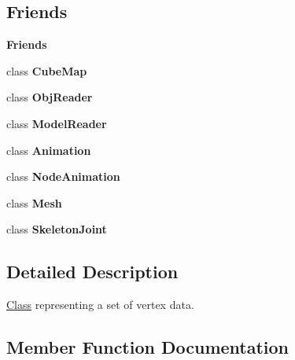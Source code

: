 \subsection*{Friends}
\begin{Indent}\textbf{ Friends}\par
\begin{DoxyCompactItemize}
\item 
\mbox{\label{classrev_1_1_vertex_array_data_a83d06bada150194666fdc02c043d1080}} 
class {\bfseries Cube\+Map}
\item 
\mbox{\label{classrev_1_1_vertex_array_data_aa89c0df06f5945a12b1d029612d199cd}} 
class {\bfseries Obj\+Reader}
\item 
\mbox{\label{classrev_1_1_vertex_array_data_ac3e0a085a76d6fcad904e95ebbe2c6a5}} 
class {\bfseries Model\+Reader}
\item 
\mbox{\label{classrev_1_1_vertex_array_data_af47625f50036c466946f960db7320bcf}} 
class {\bfseries Animation}
\item 
\mbox{\label{classrev_1_1_vertex_array_data_a395c52c1b342efdb79f36b2d4b2f1565}} 
class {\bfseries Node\+Animation}
\item 
\mbox{\label{classrev_1_1_vertex_array_data_aa41a130f156b145bffb3f4b5172c4c93}} 
class {\bfseries Mesh}
\item 
\mbox{\label{classrev_1_1_vertex_array_data_a54a2a68828f99f864406a3713e8ad9a5}} 
class {\bfseries Skeleton\+Joint}
\end{DoxyCompactItemize}
\end{Indent}


\subsection{Detailed Description}
\mbox{\hyperlink{struct_class}{Class}} representing a set of vertex data. 

\subsection{Member Function Documentation}
\mbox{\label{classrev_1_1_vertex_array_data_a35c6ded4eae6cb8288f9862e14e3d928}} 
